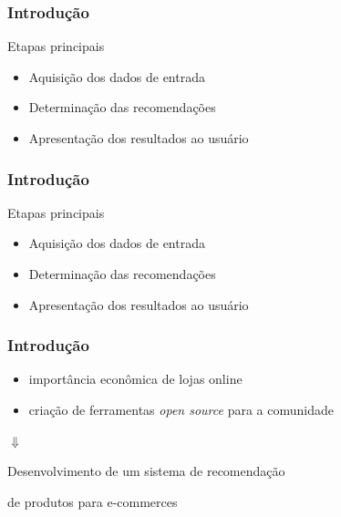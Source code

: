 \begin{frame}
\frametitle{Introdução}
\begin{block}{Etapas principais}
\begin{itemize}
	\item Aquisição dos dados de entrada
	\item Determinação das recomendações
	\item Apresentação dos resultados ao usuário
\end{itemize}
\end{block}
\end{frame}

\begin{frame}
\frametitle{Introdução}
\begin{block}{Etapas principais}
\begin{itemize}
	\item Aquisição dos dados de entrada
	\item Determinação das recomendações
	\item Apresentação dos resultados ao usuário
\end{itemize}
\end{block}
\end{frame}

\begin{frame}
\frametitle{Introdução}
\begin{itemize}
	\item importância econômica de lojas online
	\item criação de ferramentas \textit{open source} para a comunidade
\end{itemize}

\begin{center}
$\Downarrow$ 
\end{center}

\begin{center}
Desenvolvimento de um sistema de recomendação \par{} de produtos para e-commerces
\end{center}

\end{frame}
